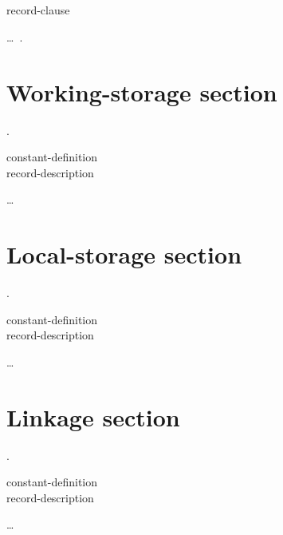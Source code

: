 \begin{0-1}
{\begin{1=}
       \\
    \end{1=}
  } \\

   \\

   \\

  record-clause
\end{0-1}\ldots\ {}.

\section{Working-storage section}
 .\newline
\begin{0-1}
  constant-definition \\
  record-description
\end{0-1}\ldots

\section{Local-storage section}
 .\newline
\begin{0-1}
  constant-definition \\
  record-description
\end{0-1}\ldots

\section{Linkage section}
 .\newline
\begin{0-1}
  constant-definition \\
  record-description
\end{0-1}\ldots

